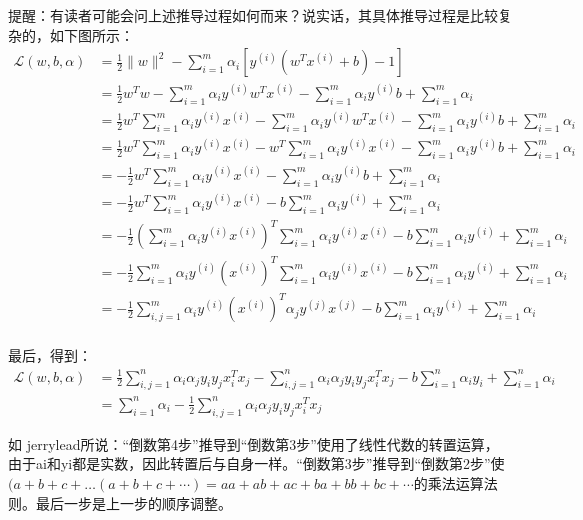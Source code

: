 \documentclass[a4paper,12pt]{article}
\begin{document}
提醒：有读者可能会问上述推导过程如何而来？说实话，其具体推导过程是比较复杂的，如下图所示：
\begin{equation}
  \begin{split}
    \mathcal{L}(w,b,\alpha)&=\frac{1}{2}\|w\|^2-\sum_{i=1}^m\alpha_i[y^{(i)}(w^Tx^{(i)}+b)-1]\\
    &=\frac{1}{2}w^Tw-\sum_{i=1}^m\alpha_iy^{(i)}w^Tx^{(i)}-\sum_{i=1}^m\alpha_iy^{(i)}b+\sum_{i=1}^m\alpha_i\\
    &=\frac{1}{2}w^T\sum_{i=1}^m\alpha_iy^{(i)}x^{(i)}-\sum_{i=1}^m\alpha_iy^{(i)}w^Tx^{(i)}-\sum_{i=1}^m\alpha_iy^{(i)}b+\sum_{i=1}^m\alpha_i\\
    &=\frac{1}{2}w^T\sum_{i=1}^m\alpha_iy^{(i)}x^{(i)}-w^T\sum_{i=1}^m\alpha_iy^{(i)}x^{(i)}-\sum_{i=1}^m\alpha_iy^{(i)}b+\sum_{i=1}^m\alpha_i\\
    &=-\frac{1}{2}w^T\sum_{i=1}^m\alpha_iy^{(i)}x^{(i)}-\sum_{i=1}^m\alpha_iy^{(i)}b+\sum_{i=1}^m\alpha_i\\
    &=-\frac{1}{2}w^T\sum_{i=1}^m\alpha_iy^{(i)}x^{(i)}-b\sum_{i=1}^m\alpha_iy^{(i)}+\sum_{i=1}^m\alpha_i\\
    &=-\frac{1}{2}\left(\sum_{i=1}^m\alpha_iy^{(i)}x^{(i)}\right)^T\sum_{i=1}^m\alpha_iy^{(i)}x^{(i)}-b\sum_{i=1}^m\alpha_iy^{(i)}+\sum_{i=1}^m\alpha_i\\
  &=-\frac{1}{2}\sum_{i=1}^m\alpha_iy^{(i)}\left(x^{(i)}\right)^T\sum_{i=1}^m\alpha_iy^{(i)}x^{(i)}-b\sum_{i=1}^m\alpha_iy^{(i)}+\sum_{i=1}^m\alpha_i\\
  &=-\frac{1}{2}\sum_{i,j=1}^m\alpha_iy^{(i)}\left(x^{(i)}\right)^T\alpha_jy^{(j)}x^{(j)}-b\sum_{i=1}^m\alpha_iy^{(i)}+\sum_{i=1}^m\alpha_i\\
  \end{split}
\end{equation}

最后，得到：
\begin{equation}
  \begin{split}
    \mathcal{L}(w,b,\alpha)&=\frac{1}{2}\sum_{i,j=1}^n\alpha_i\alpha_jy_iy_jx_i^Tx_j-\sum_{i,j=1}^n\alpha_i\alpha_jy_iy_jx_i^Tx_j-b\sum_{i=1}^n\alpha_iy_i+\sum_{i=1}^n\alpha_i\\
    &=\sum_{i=1}^n\alpha_i-\frac{1}{2}\sum_{i,j=1}^n\alpha_i\alpha_jy_iy_jx_i^Tx_j
  \end{split}
\end{equation}

如 jerrylead所说：“倒数第4步”推导到“倒数第3步”使用了线性代数的转置运算，由于ai和yi都是实数，因此转置后与自身一样。“倒数第3步”推导到“倒数第2步”使$(a+b+c+…(a+b+c+\cdots)=aa+ab+ac+ba+bb+bc+\cdots$的乘法运算法则。最后一步是上一步的顺序调整。
\end{document}
